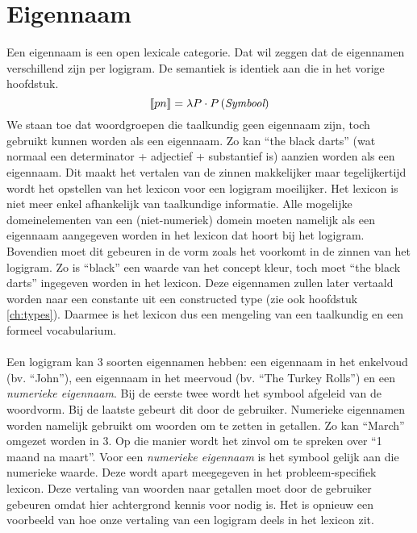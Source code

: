 \section{Eigennaam}
Een eigennaam is een open lexicale categorie. Dat wil zeggen dat de eigennamen verschillend zijn per logigram. De semantiek is identiek aan die in het vorige hoofdstuk. $$\llbracket pn\rrbracket = \lambda P \cdot P \left( \textit{Symbool} \right)$$ We staan toe dat woordgroepen die taalkundig geen eigennaam zijn, toch gebruikt kunnen worden als een eigennaam. Zo kan ``the black darts'' (wat normaal een determinator + adjectief + substantief is) aanzien worden als een eigennaam. Dit maakt het vertalen van de zinnen makkelijker maar tegelijkertijd wordt het opstellen van het lexicon voor een logigram moeilijker. Het lexicon is niet meer enkel afhankelijk van taalkundige informatie. Alle mogelijke domeinelementen van een (niet-numeriek) domein moeten namelijk als een eigennaam aangegeven worden in het lexicon dat hoort bij het logigram. Bovendien moet dit gebeuren in de vorm zoals het voorkomt in de zinnen van het logigram. Zo is ``black'' een waarde van het concept kleur, toch moet ``the black darts'' ingegeven worden in het lexicon. Deze eigennamen zullen later vertaald worden naar een constante uit een constructed type (zie ook hoofdstuk \ref{ch:types}). Daarmee is het lexicon dus een mengeling van een taalkundig en een formeel vocabularium.

\paragraph{}Een logigram kan 3 soorten eigennamen hebben: een eigennaam in het enkelvoud (bv. ``John''), een eigennaam in het meervoud (bv. ``The Turkey Rolls'') en een \textit{numerieke eigennaam}. Bij de eerste twee wordt het symbool afgeleid van de woordvorm. Bij de laatste gebeurt dit door de gebruiker. Numerieke eigennamen worden namelijk gebruikt om woorden om te zetten in getallen. Zo kan ``March'' omgezet worden in 3. Op die manier wordt het zinvol om te spreken over ``1 maand na maart''. Voor een \textit{numerieke eigennaam} is het symbool gelijk aan die numerieke waarde. Deze wordt apart meegegeven in het probleem-specifiek lexicon. Deze vertaling van woorden naar getallen moet door de gebruiker gebeuren omdat hier achtergrond kennis voor nodig is. Het is opnieuw een voorbeeld van hoe onze vertaling van een logigram deels in het lexicon zit.

